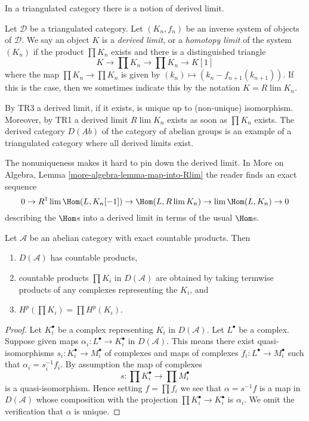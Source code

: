 \noindent
In a triangulated category there is a notion of derived limit.

\begin{definition}
\label{definition-derived-limit}
Let $\mathcal{D}$ be a triangulated category.
Let $(K_n, f_n)$ be an inverse system of objects of $\mathcal{D}$.
We say an object $K$ is a {\it derived limit}, or a
{\it homotopy limit} of the system $(K_n)$ if
the product $\prod K_n$ exists and there is a distinguished triangle
$$
K \to \prod K_n \to \prod K_n \to K[1]
$$
where the map $\prod K_n \to \prod K_n$ is given
by $(k_n) \mapsto (k_n - f_{n+1}(k_{n + 1}))$. If this is the
case, then we sometimes indicate this by the notation $K = R\lim K_n$.
\end{definition}

\noindent
By TR3 a derived limit, if it exists, is unique up to (non-unique)
isomorphism. Moreover, by TR1 a derived limit $R\lim K_n$ exists
as soon as $\prod K_n$ exists. The derived category $D(\textit{Ab})$
of the category of abelian groups is an example of a triangulated category
where all derived limits exist.

\medskip\noindent
The nonuniqueness makes it hard to pin down the derived limit. In
More on Algebra, Lemma \ref{more-algebra-lemma-map-into-Rlim}
the reader finds an exact sequence
$$
0 \to R^1\lim \Hom(L, K_n[-1]) \to \Hom(L, R\lim K_n)
\to \lim \Hom(L, K_n) \to 0
$$
describing the $\Hom$s into a derived limit in terms of the
usual $\Hom$s.

\begin{lemma}
\label{lemma-products}
Let $\mathcal{A}$ be an abelian category with exact
countable products. Then
\begin{enumerate}
\item $D(\mathcal{A})$ has countable products,
\item countable products $\prod K_i$ in $D(\mathcal{A})$ are obtained by
taking termwise products of any complexes representing the $K_i$, and
\item $H^p(\prod K_i) = \prod H^p(K_i)$.
\end{enumerate}
\end{lemma}

\begin{proof}
Let $K_i^\bullet$ be a complex representing $K_i$ in $D(\mathcal{A})$.
Let $L^\bullet$ be a complex. Suppose given maps
$\alpha_i : L^\bullet \to K_i^\bullet$ in $D(\mathcal{A})$.
This means there exist quasi-isomorphisms $s_i : K_i^\bullet \to M_i^\bullet$
of complexes and maps of complexes $f_i : L^\bullet \to M_i^\bullet$
such that $\alpha_i = s_i^{-1}f_i$. By assumption the map of complexes
$$
s : \prod K_i^\bullet \longrightarrow \prod M_i^\bullet
$$
is a quasi-isomorphism. Hence setting $f = \prod f_i$ we see that
$\alpha = s^{-1}f$ is a map in $D(\mathcal{A})$ whose composition
with the projection $\prod K_i^\bullet \to K_i^\bullet$ is $\alpha_i$.
We omit the verification that $\alpha$ is unique.
\end{proof}

